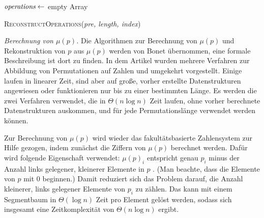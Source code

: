 \documentclass[a4paper, 10pt, ngerman]{article}
\begin{document}
\begin{algorithm}
    $\emph{operations} \gets$ empty Array \;

     \;

    \caption{\textsc{ReconstructOperations}(\emph{pre, length, index})}
\end{algorithm}

\medskip
\emph{{Berechnung von $\mu(p)$.}} Die Algorithmen zur Berechnung von $\mu(p)$ und Rekonstruktion von $p$ aus $\mu(p)$ werden von Bonet \cite{permutationranking} übernommen, eine formale Beschreibung ist dort zu finden. In dem Artikel wurden mehrere Verfahren zur Abbildung von Permutationen auf Zahlen und umgekehrt vorgestellt. Einige laufen in linearer Zeit, sind aber auf große, vorher erstellte Datenstrukturen angewiesen oder funktionieren nur bis zu einer bestimmten Länge. Es werden die zwei Verfahren verwendet, die in $\Theta(n \log n)$ Zeit laufen, ohne vorher berechnete Datenstrukturen auskommen, und für jede Permutationslänge verwendet werden können.

Zur Berechnung von $\mu(p)$ wird wieder das fakultätsbasierte Zahlensystem zur Hilfe gezogen, indem zunächst die Ziffern von $\mu(p)$ berechnet werden. Dafür wird folgende Eigenschaft verwendet: $\mu(p)_i$ entspricht genau $p_i$ minus der Anzahl links gelegener, kleinerer Elemente in $p$ \cite{permutationranking}. (Man beachte, dass die Elemente von $p$ mit 0 beginnen.) Damit reduziert sich das Problem darauf, die Anzahl kleinerer, links gelegener Elemente von $p_i$ zu zählen. Das kann mit einem Segmentbaum in $\Theta(\log n)$ Zeit pro Element gelöst werden, sodass sich insgesamt eine Zeitkomplexität von $\Theta(n \log n)$ ergibt.
\end{document}
